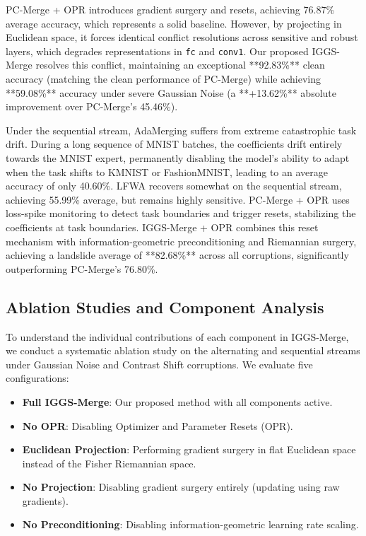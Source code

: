 \documentclass{article}
\theoremstyle{plain}
\theoremstyle{definition}
\theoremstyle{remark}
\begin{document}
PC-Merge + OPR introduces gradient surgery and resets, achieving 76.87\% average accuracy, which represents a solid baseline. However, by projecting in Euclidean space, it forces identical conflict resolutions across sensitive and robust layers, which degrades representations in \texttt{fc} and \texttt{conv1}. Our proposed IGGS-Merge resolves this conflict, maintaining an exceptional **92.83\%** clean accuracy (matching the clean performance of PC-Merge) while achieving **59.08\%** accuracy under severe Gaussian Noise (a **+13.62\%** absolute improvement over PC-Merge's 45.46\%). 

Under the sequential stream, AdaMerging suffers from extreme catastrophic task drift. During a long sequence of MNIST batches, the coefficients drift entirely towards the MNIST expert, permanently disabling the model's ability to adapt when the task shifts to KMNIST or FashionMNIST, leading to an average accuracy of only 40.60\%. LFWA recovers somewhat on the sequential stream, achieving 55.99\% average, but remains highly sensitive. PC-Merge + OPR uses loss-spike monitoring to detect task boundaries and trigger resets, stabilizing the coefficients at task boundaries. IGGS-Merge + OPR combines this reset mechanism with information-geometric preconditioning and Riemannian surgery, achieving a landslide average of **82.68\%** across all corruptions, significantly outperforming PC-Merge's 76.80\%.

\subsection{Ablation Studies and Component Analysis}
To understand the individual contributions of each component in IGGS-Merge, we conduct a systematic ablation study on the alternating and sequential streams under Gaussian Noise and Contrast Shift corruptions. We evaluate five configurations:
\begin{itemize}
    \item \textbf{Full IGGS-Merge}: Our proposed method with all components active.
    \item \textbf{No OPR}: Disabling Optimizer and Parameter Resets (OPR).
    \item \textbf{Euclidean Projection}: Performing gradient surgery in flat Euclidean space instead of the Fisher Riemannian space.
    \item \textbf{No Projection}: Disabling gradient surgery entirely (updating using raw gradients).
    \item \textbf{No Preconditioning}: Disabling information-geometric learning rate scaling.
\end{itemize}
\end{document}
